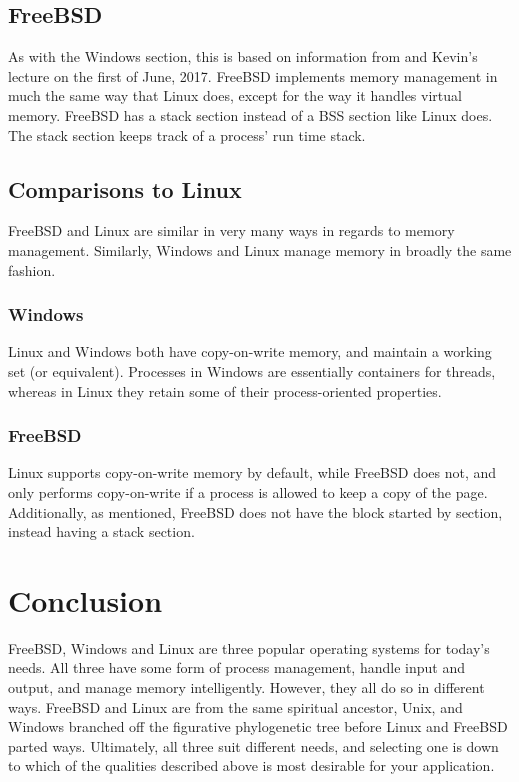 \documentclass[10pt,draftclsnofoot,onecolumn,compsoc]{IEEEtran}
\begin{document}
	\subsection{FreeBSD}
	
	As with the Windows section, this is based on information from \cite{BSD} and Kevin's lecture on the first of June, 2017. FreeBSD implements memory management in much the same way that Linux does, except for the way it handles virtual memory. FreeBSD has a stack section instead of a BSS section like Linux does. The stack section keeps track of a process' run time stack.
	
	\subsection{Comparisons to Linux}
	
	FreeBSD and Linux are similar in very many ways in regards to memory management. Similarly, Windows and Linux manage memory in broadly the same fashion.
	
	\subsubsection{Windows}
	
	Linux and Windows both have copy-on-write memory, and maintain a working set (or equivalent). Processes in Windows are essentially containers for threads, whereas in Linux they retain some of their process-oriented properties.
	
	\subsubsection{FreeBSD}
	
	Linux supports copy-on-write memory by default, while FreeBSD does not, and only performs copy-on-write if a process is allowed to keep a copy of the page. Additionally, as mentioned, FreeBSD does not have the block started by section, instead having a stack section.
	
	\section{Conclusion}
	
	FreeBSD, Windows and Linux are three popular operating systems for today's needs. All three have some form of process management, handle input and output, and manage memory intelligently. However, they all do so in different ways. FreeBSD and Linux are from the same spiritual ancestor, Unix\texttrademark, and Windows branched off the figurative phylogenetic tree before Linux and FreeBSD parted ways. Ultimately, all three suit different needs, and selecting one is down to which of the qualities described above is most desirable for your application.
	

	

\end{document}
